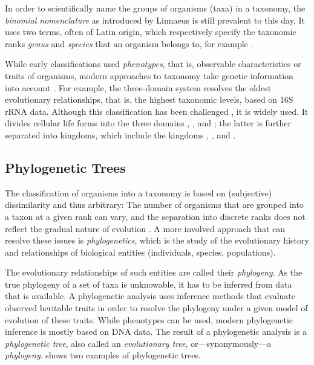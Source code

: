 In order to scientifically name the groups of organisms (taxa) in a taxonomy,
the \emph{binomial nomenclature} as introduced by Linnaeus is still prevalent to this day.
It uses two terms, often of Latin origin,
which respectively specify the taxonomic ranks \emph{genus} and \emph{species} that an organism belongs to,
for example .

While early classifications used \emph{phenotypes}, that is, observable characteristics or traits of organisms,
modern approaches to taxonomy take genetic information into account \cite{Mayr2002}.
For example, the three-domain system \cite{Woese1977,Woese1990} resolves the oldest evolutionary relationships,
that is, the highest taxonomic levels, based on 16S rRNA data.
Although this classification has been challenged \cite{Gupta1998,Mayr1998,Cavalier-Smith2002}, it is widely used.
It divides cellular life forms into the three domains , , and ;
the latter is further separated into kingdoms,
which include the kingdoms , , and .



\subsection{Phylogenetic Trees}
\label{ch:Foundations:sec:TreeOfLife:sub:PhylogeneticTrees}

The classification of organisms into a taxonomy is based on (subjective) dissimilarity and thus arbitrary:
The number of organisms that are grouped into a taxon at a given rank can vary,
and the separation into discrete ranks does not reflect the gradual nature of evolution \cite{Gingerich1987}.
A more involved approach that can resolve these issues is \emph{phylogenetics},
which is the study of the evolutionary history and relationships of biological entities (individuals, species, populations).

The evolutionary relationships of such entities are called their \emph{phylogeny}.
As the true phylogeny of a set of taxa is unknowable,
it has to be inferred from data that is available.
A phylogenetic analysis uses inference methods that evaluate observed heritable traits
in order to resolve the phylogeny under a given model of evolution of these traits.
While phenotypes can be used, modern phylogenetic inference is mostly based on DNA data.
The result of a phylogenetic analysis is a \emph{phylogenetic tree},
also called an \emph{evolutionary tree}, or---synonymously---a \emph{phylogeny}.
 shows two examples of phylogenetic trees.


